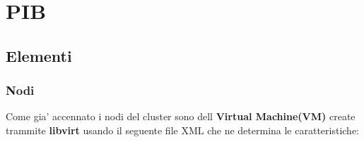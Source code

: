 \usepackage{listings}

\section{PIB}
\subsection{Elementi}
\subsubsection{Nodi}
Come gia' accennato i nodi del cluster sono dell \textbf{Virtual Machine(VM)} create trammite 
\textbf{libvirt} usando il seguente file XML che ne determina le caratteristiche:
\\
\\
\\
